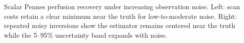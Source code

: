 \caption{Scalar Pennes perfusion recovery under increasing observation noise. Left: scan costs retain a clear minimum near the truth for low-to-moderate noise. Right: repeated noisy inversions show the estimator remains centered near the truth while the 5--95\% uncertainty band expands with noise.}\label{fig:scalar-identifiability-noise}
